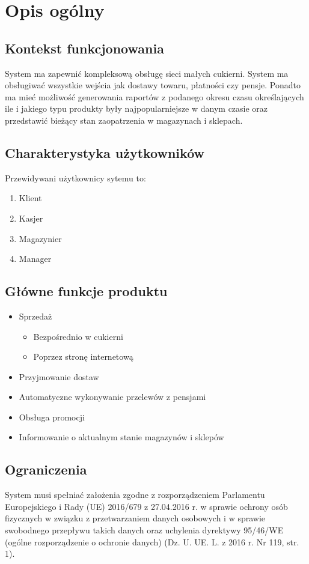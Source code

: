 \documentclass{article}
\begin{document}
\section{Opis ogólny}
\subsection{Kontekst funkcjonowania}
System ma zapewnić kompleksową obsługę sieci małych cukierni.
System ma obsługiwać wszystkie wejścia jak dostawy towaru, płatności czy pensje. 
Ponadto ma mieć możliwość generowania raportów z podanego okresu czasu określających ile i jakiego typu produkty były najpopularniejsze w danym czasie oraz przedstawić bieżący stan zaopatrzenia w magazynach i sklepach. 

\subsection{Charakterystyka użytkowników}
Przewidywani użytkownicy sytemu to:
\begin{enumerate}
\item Klient
\item Kasjer
\item Magazynier
\item Manager 
\end{enumerate}
\subsection{Główne funkcje produktu}
\begin{itemize}
    \item Sprzedaż
    \begin{itemize}
        \item  Bezpośrednio w cukierni
        \item  Poprzez stronę internetową
    \end{itemize}

    \item Przyjmowanie dostaw
    \item Automatyczne wykonywanie przelewów z pensjami
    \item Obsługa promocji
    \item Informowanie o aktualnym stanie magazynów i sklepów
\end{itemize}
\subsection{Ograniczenia}
System musi spełniać założenia zgodne z rozporządzeniem Parlamentu Europejskiego i Rady (UE) 2016/679 z 27.04.2016 r. w sprawie ochrony osób fizycznych w związku z przetwarzaniem danych osobowych i w sprawie swobodnego przepływu takich danych oraz uchylenia dyrektywy 95/46/WE (ogólne rozporządzenie o ochronie danych) (Dz. U. UE. L. z 2016 r. Nr 119, str. 1).
\end{document}
